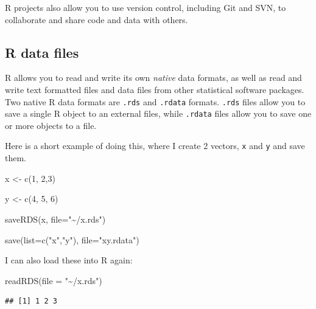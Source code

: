 \documentclass[
]{book}
\newenvironment{Shaded}{\begin{snugshade}}{\end{snugshade}}
\newcommand{\AttributeTok}[1]{\textcolor[rgb]{0.77,0.63,0.00}{#1}}
\newcommand{\DecValTok}[1]{\textcolor[rgb]{0.00,0.00,0.81}{#1}}
\newcommand{\FunctionTok}[1]{\textcolor[rgb]{0.00,0.00,0.00}{#1}}
\newcommand{\NormalTok}[1]{#1}
\newcommand{\OtherTok}[1]{\textcolor[rgb]{0.56,0.35,0.01}{#1}}
\newcommand{\StringTok}[1]{\textcolor[rgb]{0.31,0.60,0.02}{#1}}
\begin{document}
R projects also allow you to use version control, including Git and SVN,
to collaborate and share code and data with others.

\hypertarget{r-data-files}{%
\subsection{R data files}\label{r-data-files}}

R allows you to read and write its own \emph{native} data formats, as well as
read and write text formatted files and data files from other
statistical software packages. Two native R data formats are \texttt{.rds} and
\texttt{.rdata} formats. \texttt{.rds} files allow you to save a single R object to an
external files, while \texttt{.rdata} files allow you to save one or more
objects to a file.

Here is a short example of doing this, where I create 2 vectors, \texttt{x} and
\texttt{y} and save them.

\begin{Shaded}
\begin{Highlighting}[]
\NormalTok{x }\OtherTok{\textless{}{-}} \FunctionTok{c}\NormalTok{(}\DecValTok{1}\NormalTok{, }\DecValTok{2}\NormalTok{,}\DecValTok{3}\NormalTok{)}

\NormalTok{y }\OtherTok{\textless{}{-}} \FunctionTok{c}\NormalTok{(}\DecValTok{4}\NormalTok{, }\DecValTok{5}\NormalTok{, }\DecValTok{6}\NormalTok{)}

\FunctionTok{saveRDS}\NormalTok{(x, }
        \AttributeTok{file=}\StringTok{"\textasciitilde{}/x.rds"}\NormalTok{)}

\FunctionTok{save}\NormalTok{(}\AttributeTok{list=}\FunctionTok{c}\NormalTok{(}\StringTok{"x"}\NormalTok{,}\StringTok{"y"}\NormalTok{),}
     \AttributeTok{file=}\StringTok{"xy.rdata"}\NormalTok{)}
\end{Highlighting}
\end{Shaded}

I can also load these into R again:

\begin{Shaded}
\begin{Highlighting}[]
\FunctionTok{readRDS}\NormalTok{(}\AttributeTok{file =} \StringTok{"\textasciitilde{}/x.rds"}\NormalTok{)}
\end{Highlighting}
\end{Shaded}

\begin{verbatim}
## [1] 1 2 3
\end{verbatim}
\end{document}
